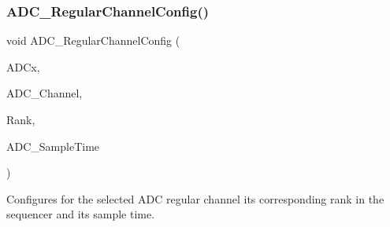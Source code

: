 \subsubsection{\texorpdfstring{ADC\_RegularChannelConfig()}{ADC\_RegularChannelConfig()}}
{\footnotesize\ttfamily void A\+D\+C\+\_\+\+Regular\+Channel\+Config (\begin{DoxyParamCaption}\item[{\mbox{\hyperlink{struct_a_d_c___type_def}{A\+D\+C\+\_\+\+Type\+Def}} $\ast$}]{A\+D\+Cx,  }\item[{uint8\+\_\+t}]{A\+D\+C\+\_\+\+Channel,  }\item[{uint8\+\_\+t}]{Rank,  }\item[{uint8\+\_\+t}]{A\+D\+C\+\_\+\+Sample\+Time }\end{DoxyParamCaption})}



Configures for the selected A\+DC regular channel its corresponding rank in the sequencer and its sample time. 


